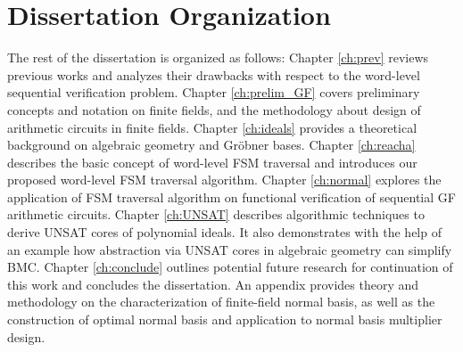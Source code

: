 \section{Dissertation Organization}
The rest of the dissertation is organized as
follows: Chapter \ref{ch:prev} reviews previous works and analyzes their drawbacks with respect to 
the word-level sequential verification problem.
Chapter \ref{ch:prelim_GF} covers preliminary
concepts and notation on finite fields, and the methodology about design of arithmetic circuits in finite fields.
Chapter \ref{ch:ideals} provides a theoretical background on algebraic geometry and Gr\"obner bases.
Chapter \ref{ch:reacha} describes the basic
concept of word-level FSM traversal and introduces our proposed word-level FSM traversal algorithm. 
Chapter \ref{ch:normal} explores the application of FSM traversal algorithm on 
functional verification of sequential GF arithmetic circuits. Chapter \ref{ch:UNSAT} describes
algorithmic techniques to derive UNSAT cores of polynomial
ideals. It also demonstrates with the help of an example how abstraction via
UNSAT cores in algebraic geometry can simplify BMC. 
Chapter \ref{ch:conclude} outlines potential future research for
continuation of this work and concludes the dissertation. 
An appendix provides theory and methodology on the characterization of finite-field normal basis,
as well as the construction of optimal normal basis and application to normal basis multiplier design.
